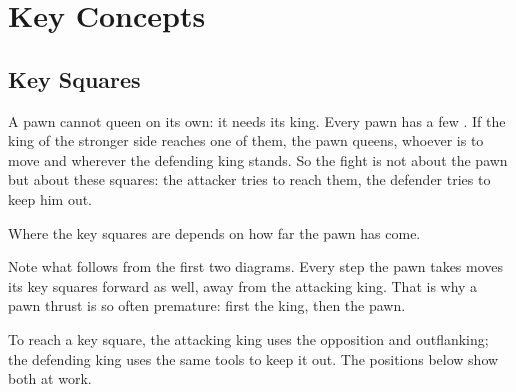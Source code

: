
\section{Key Concepts}\label{sec:key-concepts}

\subsection{Key Squares}
A pawn cannot queen on its own: it needs its king. Every pawn has a few
.
If the king of the stronger side reaches one of them, the pawn queens, whoever is to move and
wherever the defending king stands. So the fight is not about the pawn but about these squares:
the attacker tries to reach them, the defender tries to keep him out.

Where the key squares are depends on how far the pawn has come.





Note what follows from the first two diagrams. Every step the pawn takes moves its key squares
forward as well, away from the attacking king. That is why a pawn thrust is so often premature:
first the king, then the pawn.

To reach a key square, the attacking king uses the opposition and outflanking; the defending king
uses the same tools to keep it out. The positions below show both at work.

